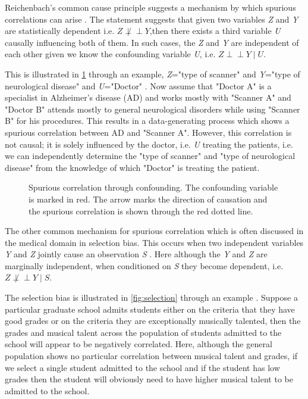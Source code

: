 \documentclass[12pt,DIV14,BCOR12mm,a4paper,footinclude=false,headinclude,parskip=half-,twoside,openright,cleardoublepage=empty,toc=index,bibliography=totoc,listof=totoc]{scrreprt}
\numberwithin{equation}{chapter}
\begin{document}
Reichenbach's common cause principle suggests a mechanism by which spurious correlations can arise \cite{peters_2017_elements}. The statement suggests that given two variables \textit{Z} and \textit{Y} are statistically dependent i.e. $Z \not\perp\!\!\!\perp Y$,then there exists a third variable \textit{U} causally influencing both of them. In such cases, the \textit{Z} and \textit{Y} are independent of each other given we know the confounding variable \textit{U}, i.e. $Z\perp\!\!\!\perp Y\mid U$.

This is illustrated in \ref{fig:confounding} through an example, \textit{Z}="type of scanner" and \textit{Y}="type of neurological disease" and \textit{U}="Doctor" \cite{10162210}. Now assume that "Doctor A" is a specialist in Alzheimer's disease (AD) and works mostly with "Scanner A" and "Doctor B" attends mostly to general neurological disorders while using "Scanner B" for his procedures. This results in a data-generating process which shows a spurious correlation between AD and "Scanner A". However, this correlation is not causal; it is solely influenced by the doctor, i.e. \textit{U} treating the patients, i.e. we can independently determine the "type of scanner" and "type of neurological disease" from the knowledge of which "Doctor" is treating the patient.

\begin{figure}[H]
    \centering
     
    \caption{Spurious correlation through confounding. The confounding variable is marked in red. The arrow marks the direction of causation and the spurious correlation is shown through the red dotted line.}
    \label{fig:confounding}
\end{figure}

The other common mechanism for spurious correlation which is often discussed in the medical domain in selection bias. This occurs when two independent variables \textit{Y} and \textit{Z} jointly cause an observation \textit{S} \cite{Pearl09}. Here although the \textit{Y} and \textit{Z} are marginally independent, when conditioned on \textit{S} they become dependent, i.e. $Z\not\perp\!\!\!\perp Y\mid S$. 

The selection bias is illustrated in \ref{fig:selection} through an example \cite{Pearl09}. Suppose a particular graduate school admits students either on the criteria that they have good grades or on the criteria they are exceptionally musically talented, then the grades and musical talent across the population of students admitted to the school will appear to be negatively correlated. Here, although the general population shows no particular correlation between musical talent and grades, if we select a single student admitted to the school and if the student has low grades then the student will obviously need to have higher musical talent to be admitted to the school.
\end{document}
